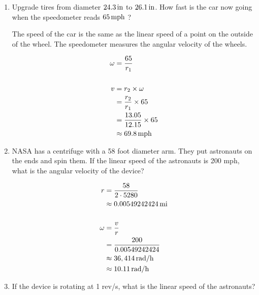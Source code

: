 \documentclass{exam}
\begin{document}
  \begin{enumerate}

    \item Upgrade tires from diameter $\unit[24.3]{in}$ to $\unit[26.1]{in}$.  How fast is the car now going when the
      speedometer reads $\unit[65]{mph}$ ?

      \begin{solution}
        The speed of the car is the same as the linear speed of a point on the outside of the wheel.  The speedometer
        measures the angular velocity of the wheels.

        \begin{align*}
          \omega & = \frac{65}{r_1} \\
          \\
          v & = r_2 \times \omega \\
            & = \frac{r_2}{r_1} \times 65 \\
            & = \frac{13.05}{12.15} \times 65 \\
            & \approx \unit[69.8]{mph} \\
        \end{align*}

      \end{solution}

    \item NASA has a centrifuge with a 58 foot diameter arm.  They put astronauts on the ends and spin them.  If the
      linear speed of the astronauts is 200 mph, what is the angular velocity of the device?

      \begin{solution}
        \begin{align*}
          r & = \frac{58}{2 \cdot 5280} \\
            & \approx \unit[0.00549242424]{mi} \\
          \\
          \omega & = \frac{v}{r} \\
                 & = \frac{200}{0.00549242424} \\
                 & \approx \unit[36,414]{rad/h} \\
                 & \approx \unit[10.11]{rad/h} \\
        \end{align*}
      \end{solution}

      \item If the device is rotating at 1 rev/s, what is the linear speed of the astronauts?

  \end{enumerate}
\end{document}

